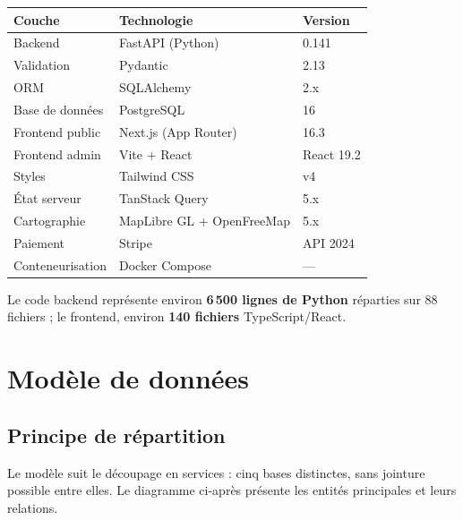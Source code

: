 \documentclass[11pt,a4paper]{report}
\begin{document}
\begin{longtable}{@{}p{3.6cm}p{5.4cm}p{5.4cm}@{}}
\toprule
\textbf{Couche} & \textbf{Technologie} & \textbf{Version} \\
\midrule
\endhead
Backend & FastAPI (Python) & 0.141 \\
Validation & Pydantic & 2.13 \\
ORM & SQLAlchemy & 2.x \\
Base de données & PostgreSQL & 16 \\
Frontend public & Next.js (App Router) & 16.3 \\
Frontend admin & Vite + React & React 19.2 \\
Styles & Tailwind CSS & v4 \\
État serveur & TanStack Query & 5.x \\
Cartographie & MapLibre GL + OpenFreeMap & 5.x \\
Paiement & Stripe & API 2024 \\
Conteneurisation & Docker Compose & --- \\
\bottomrule
\end{longtable}

Le code backend représente environ \textbf{6\,500 lignes de Python} réparties
sur 88 fichiers ; le frontend, environ \textbf{140 fichiers} TypeScript/React.

\chapter{Modèle de données}

\section{Principe de répartition}

Le modèle suit le découpage en services : cinq bases distinctes, sans jointure
possible entre elles. Le diagramme ci-après présente les entités principales et
leurs relations.
\end{document}
